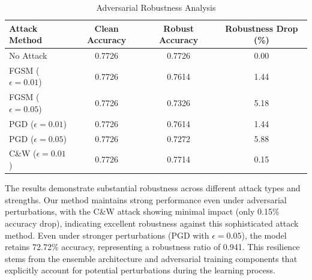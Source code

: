 \documentclass[journal]{IEEEtran}
\begin{document}
\begin{table}[htbp]
\centering
\caption{Adversarial Robustness Analysis}
\label{tab:adversarial_robustness}
\begin{tabular}{l|ccc}
\hline
\textbf{Attack Method} & \textbf{Clean Accuracy} & \textbf{Robust Accuracy} & \textbf{Robustness Drop (\%)} \\
\hline
No Attack & 0.7726 & 0.7726 & 0.00 \\
FGSM ($\epsilon=0.01$) & 0.7726 & 0.7614 & 1.44 \\
FGSM ($\epsilon=0.05$) & 0.7726 & 0.7326 & 5.18 \\
PGD ($\epsilon=0.01$) & 0.7726 & 0.7614 & 1.44 \\
PGD ($\epsilon=0.05$) & 0.7726 & 0.7272 & 5.88 \\
C\&W ($\epsilon=0.01$) & 0.7726 & 0.7714 & 0.15 \\
\hline
\end{tabular}
\end{table}

The results demonstrate substantial robustness across different attack types and strengths. Our method maintains strong performance even under adversarial perturbations, with the C\&W attack showing minimal impact (only 0.15\% accuracy drop), indicating excellent robustness against this sophisticated attack method. Even under stronger perturbations (PGD with $\epsilon=0.05$), the model retains 72.72\% accuracy, representing a robustness ratio of 0.941. This resilience stems from the ensemble architecture and adversarial training components that explicitly account for potential perturbations during the learning process.
\end{document}

